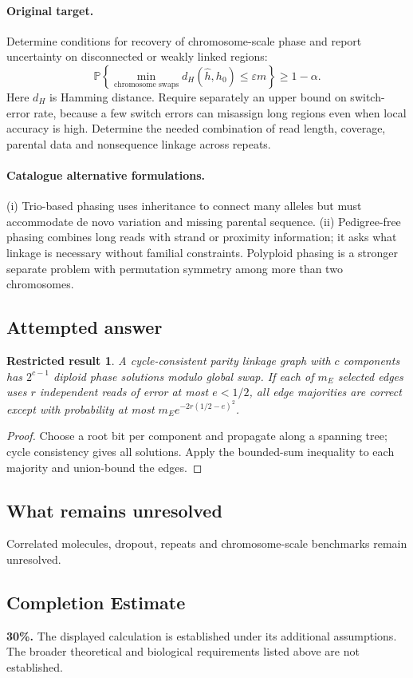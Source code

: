 \documentclass[11pt]{article}
\newcommand{\Prob}{\mathbb P}
\providecommand{\Prob}{\mathbb P}
\newtheorem{attemptresult}{Restricted result}[section]
\begin{document}
\paragraph{Original target.}
Determine conditions for recovery of chromosome-scale phase and report uncertainty on disconnected or weakly linked regions:
\[\Prob\!\left\{\min_{\text{chromosome swaps}}d_H(\widehat h,h_0)\le\varepsilon m\right\}\ge1-\alpha.\]
Here $d_H$ is Hamming distance. Require separately an upper bound on switch-error rate, because a few switch errors can misassign long regions even when local accuracy is high. Determine the needed combination of read length, coverage, parental data and nonsequence linkage across repeats.
\paragraph{Catalogue alternative formulations.}
(i) Trio-based phasing uses inheritance to connect many alleles but must accommodate de novo variation and missing parental sequence. (ii) Pedigree-free phasing combines long reads with strand or proximity information; it asks what linkage is necessary without familial constraints. Polyploid phasing is a stronger separate problem with permutation symmetry among more than two chromosomes.
\subsection{Attempted answer}
\begin{attemptresult}
A cycle-consistent parity linkage graph with $c$ components has $2^{c-1}$ diploid phase solutions modulo global swap. If each of $m_E$ selected edges uses $r$ independent reads of error at most $e<1/2$, all edge majorities are correct except with probability at most $m_Ee^{-2r(1/2-e)^2}$.
\end{attemptresult}
\begin{proof}
Choose a root bit per component and propagate along a spanning tree; cycle consistency gives all solutions. Apply the bounded-sum inequality to each majority and union-bound the edges.
\end{proof}
\subsection{What remains unresolved}
Correlated molecules, dropout, repeats and chromosome-scale benchmarks remain unresolved.
\subsection{Completion Estimate}
\textbf{30\%.} The displayed calculation is established under its additional assumptions. The broader theoretical and biological requirements listed above are not established.
\end{document}
